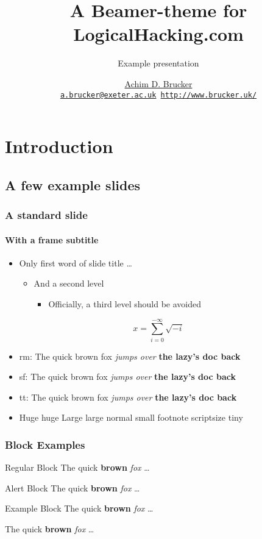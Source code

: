 \documentclass[%
 titlelight
 ,aspectratio=169,classification=public-cc-by]{lh-presentation}
\title{A Beamer-theme for LogicalHacking.com}
\subtitle{Example presentation}
\institute[University of Exeter]
{Department of Computer Science, The University of Exeter, Exeter, UK}
\author[A.D. Brucker] {%
    \href{http://www.brucker.uk/}{Achim D. Brucker}\\
    \texttt{\footnotesize\href{mailto:"Achim D. Brucker"
        <a.brucker@exeter.ac.uk>}{a.brucker@exeter.ac.uk}
      \hspace{.6cm}
      \url{http://www.brucker.uk/}}
    }
\begin{document}
\begin{frame}[plain]
  \maketitle
\end{frame}

\AgendaFrame

\section{Introduction}
\subsection{A few example slides}
\frame{\sectionpage}
\begin{frame}[classification={confidential}]
  \frametitle{A standard slide}
  \framesubtitle{With a frame subtitle}
  \begin{itemize}
  \item Only first word of slide title \ldots
    \begin{itemize}
    \item  And a second level 
      \begin{itemize}
      \item  Officially, a third level should be avoided
      \end{itemize}
    \end{itemize}
  \end{itemize}
  \[ x = \sum_{i=0}^{-\infty}\sqrt{-i}\]
\begin{itemize}
\item rm: {\rmfamily The quick {\mdseries brown fox} \emph{jumps over} \textbf{the lazy's doc back}}
\item sf: {\sffamily The quick {\mdseries brown fox} \emph{jumps over} \textbf{the lazy's doc back}}
\item tt: {\ttfamily The quick {\mdseries brown fox} \emph{jumps over} \textbf{the lazy's doc back}}
\item {\Huge Huge} {\huge huge} {\Large Large} {\large large} {\normalsize normal} {\small small} 
      {\footnotesize footnote} {\scriptsize scriptsize} {\tiny tiny}
\end{itemize}
\end{frame}

\begin{frame}
\frametitle{Block Examples}
\begin{block}{Regular Block}
The \alert{quick} \textbf{brown} \emph{fox} \ldots
\end{block}
\begin{alertblock}{Alert Block}
The \alert{quick} \textbf{brown} \emph{fox} \ldots
\end{alertblock}
\begin{exampleblock}{Example Block}
The \alert{quick} \textbf{brown} \emph{fox} \ldots
\end{exampleblock}
\begin{quotebox}
The \alert{quick} \textbf{brown} \emph{fox} \ldots
\end{quotebox}
\end{frame}
\end{document}
